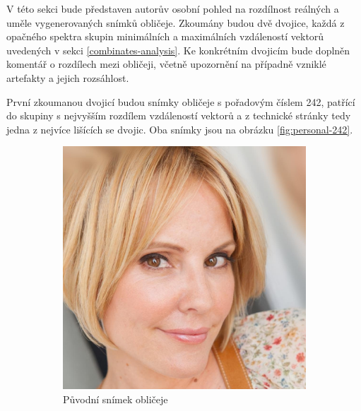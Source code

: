 V této sekci bude představen autorův osobní pohled na rozdílnost reálných a uměle vygenerovaných snímků obličeje. Zkoumány budou dvě dvojice, každá z opačného spektra skupin minimálních a maximálních vzdáleností vektorů uvedených v sekci \ref{combinates-analysis}. Ke konkrétním dvojicím bude doplněn komentář o rozdílech mezi obličeji, včetně upozornění na případně vzniklé artefakty a jejich rozsáhlost.

\bigskip

\noindent První zkoumanou dvojicí budou snímky obličeje s pořadovým číslem 242, patřící do skupiny s nejvyšším rozdílem vzdáleností vektorů a z technické stránky tedy jedna z nejvíce lišících se dvojic. Oba snímky jsou na obrázku \ref{fig:personal-242}.

\begin{figure}[H]
    \centering
    \begin{subfigure}{0.45\textwidth}
         \centering
         \includegraphics[width=1\textwidth]{obrazky-figures/real-242.jpg}
         \caption{Původní snímek obličeje}
         \label{fig:personal-242-real}
     \end{subfigure}
     \hfill
     \begin{subfigure}{0.45\textwidth}
         \centering

\end{subfigure}
\end{figure}
